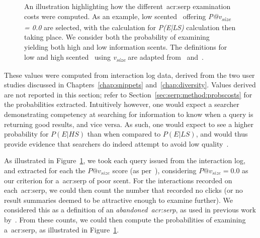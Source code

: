 \begin{figure}[t!]
    \centering
    \caption[Computing~\gls{acr:serp} examination probabilities]{An illustration highlighting how the different~\gls{acr:serp} examination costs were computed. As an example, low scented~ offering \emph{P@v\textsubscript{size} = 0.0} are selected, with the calculation for \emph{P(E|LS)} calculation then taking place. We consider both the probability of examining~ yielding both high and low information scents. The definitions for low and high scented~ using \emph{v\textsubscript{size}} are adapted from~\cite{wu2014information_scent} and~\cite{hassan2013serp_abandonment}.}
    \label{fig:serp_probabilities}
\end{figure}

These values were computed from interaction log data, derived from the two user studies discussed in Chapters~\ref{chap:snippets} and~\ref{chap:diversity}. Values derived are not reported in this section; refer to Section~\ref{sec:serp:method:probscosts} for the probabilities extracted. Intuitively however, one would expect a searcher demonstrating competency at searching for information to know when a query is returning good results, and vice versa. As such, one would expect to see a higher probability for $P(E|HS)$ than when compared to $P(E|LS)$, and would thus provide evidence that searchers do indeed attempt to avoid low quality~.

As illustrated in Figure~\ref{fig:serp_probabilities}, we took each query issued from the interaction log, and extracted for each the $P@v_{size}$ score (as per~\cite{wu2014information_scent}), considering $P@v_{size}=0.0$ as our criterion for a~\gls{acr:serp} of poor scent. For the interactions recorded on each~\gls{acr:serp}, we could then count the number that recorded no clicks (or no result summaries deemed to be attractive enough to examine further). We considered this as a definition of an \emph{abandoned~\gls{acr:serp}}, as used in previous work by~\cite{hassan2013serp_abandonment}. From these counts, we could then compute the probabilities of examining a~\gls{acr:serp}, as illustrated in Figure~\ref{fig:serp_probabilities}.

